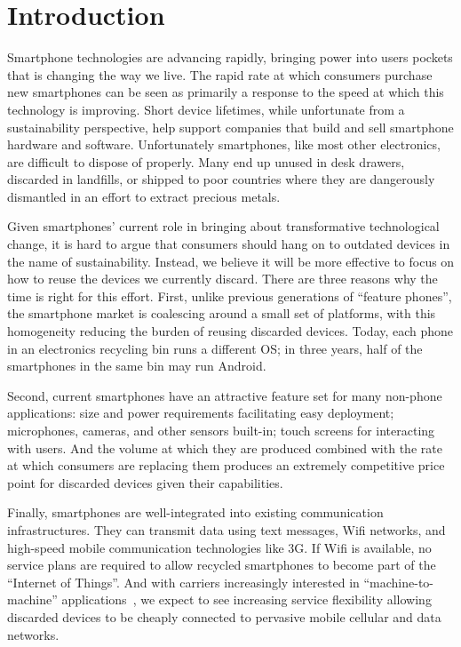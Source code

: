 \section{Introduction}

Smartphone technologies are advancing rapidly, bringing power into users
pockets that is changing the way we live. The rapid rate at which consumers
purchase new smartphones can be seen as primarily a response to the speed at
which this technology is improving. Short device lifetimes, while unfortunate
from a sustainability perspective, help support companies that build and sell
smartphone hardware and software. Unfortunately smartphones, like most other
electronics, are difficult to dispose of properly. Many end up unused in desk
drawers, discarded in landfills, or shipped to poor countries where they are
dangerously dismantled in an effort to extract precious metals.

Given smartphones' current role in bringing about transformative
technological change, it is hard to argue that consumers should hang on to
outdated devices in the name of sustainability. Instead, we believe it will
be more effective to focus on how to reuse the devices we currently discard.
There are three reasons why the time is right for this effort. First, unlike
previous generations of ``feature phones'', the smartphone market is
coalescing around a small set of platforms, with this homogeneity reducing
the burden of reusing discarded devices. Today, each phone in an electronics
recycling bin runs a different OS; in three years, half of the smartphones in
the same bin may run Android.

Second, current smartphones have an attractive feature set for many non-phone
applications: size and power requirements facilitating easy deployment;
microphones, cameras, and other sensors built-in; touch screens for
interacting with users. And the volume at which they are produced combined
with the rate at which consumers are replacing them produces an extremely
competitive price point for discarded devices given their capabilities.

Finally, smartphones are well-integrated into existing communication
infrastructures. They can transmit data using text messages, Wifi networks,
and high-speed mobile communication technologies like 3G. If Wifi is
available, no service plans are required to allow recycled smartphones to
become part of the ``Internet of Things''. And with carriers increasingly
interested in ``machine-to-machine'' applications~\cite{sprint-m2m}, we
expect to see increasing service flexibility allowing discarded devices to be
cheaply connected to pervasive mobile cellular and data networks.

